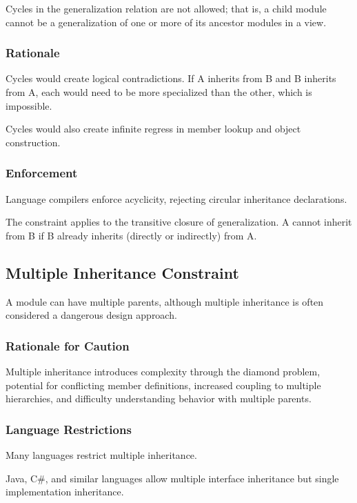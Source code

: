 \documentclass[11pt]{article}
\begin{document}
Cycles in the generalization relation are not allowed; that is, a child module cannot be a generalization of one or more of its ancestor modules in a view.

\subsubsection{Rationale}

Cycles would create logical contradictions. If A inherits from B and B inherits from A, each would need to be more specialized than the other, which is impossible.

Cycles would also create infinite regress in member lookup and object construction.

\subsubsection{Enforcement}

Language compilers enforce acyclicity, rejecting circular inheritance declarations.

The constraint applies to the transitive closure of generalization. A cannot inherit from B if B already inherits (directly or indirectly) from A.

\subsection{Multiple Inheritance Constraint}

A module can have multiple parents, although multiple inheritance is often considered a dangerous design approach.

\subsubsection{Rationale for Caution}

Multiple inheritance introduces complexity through the diamond problem, potential for conflicting member definitions, increased coupling to multiple hierarchies, and difficulty understanding behavior with multiple parents.

\subsubsection{Language Restrictions}

Many languages restrict multiple inheritance.

Java, C\#, and similar languages allow multiple interface inheritance but single implementation inheritance.
\end{document}
